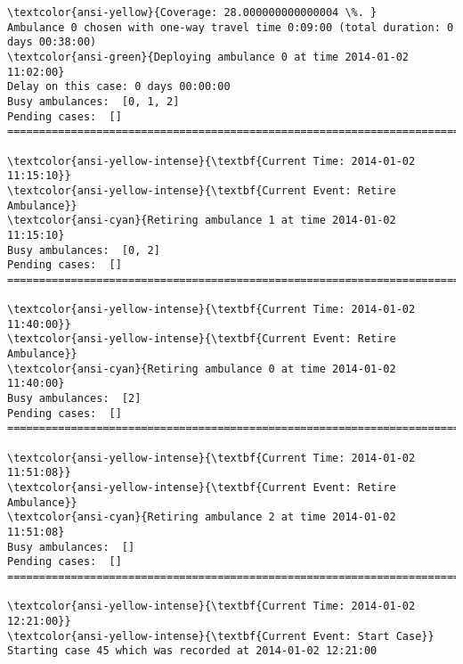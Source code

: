 \documentclass[11pt]{article}
\begin{document}
    \begin{Verbatim}[commandchars=\\\{\}]
\textcolor{ansi-yellow}{Coverage: 28.000000000000004 \%. }
Ambulance 0 chosen with one-way travel time 0:09:00 (total duration: 0 days 00:38:00)
\textcolor{ansi-green}{Deploying ambulance 0 at time 2014-01-02 11:02:00}
Delay on this case: 0 days 00:00:00
Busy ambulances:  [0, 1, 2]
Pending cases:  []
========================================================================

\textcolor{ansi-yellow-intense}{\textbf{Current Time: 2014-01-02 11:15:10}}
\textcolor{ansi-yellow-intense}{\textbf{Current Event: Retire Ambulance}}
\textcolor{ansi-cyan}{Retiring ambulance 1 at time 2014-01-02 11:15:10}
Busy ambulances:  [0, 2]
Pending cases:  []
========================================================================

\textcolor{ansi-yellow-intense}{\textbf{Current Time: 2014-01-02 11:40:00}}
\textcolor{ansi-yellow-intense}{\textbf{Current Event: Retire Ambulance}}
\textcolor{ansi-cyan}{Retiring ambulance 0 at time 2014-01-02 11:40:00}
Busy ambulances:  [2]
Pending cases:  []
========================================================================

\textcolor{ansi-yellow-intense}{\textbf{Current Time: 2014-01-02 11:51:08}}
\textcolor{ansi-yellow-intense}{\textbf{Current Event: Retire Ambulance}}
\textcolor{ansi-cyan}{Retiring ambulance 2 at time 2014-01-02 11:51:08}
Busy ambulances:  []
Pending cases:  []
========================================================================

\textcolor{ansi-yellow-intense}{\textbf{Current Time: 2014-01-02 12:21:00}}
\textcolor{ansi-yellow-intense}{\textbf{Current Event: Start Case}}
Starting case 45 which was recorded at 2014-01-02 12:21:00

    \end{Verbatim}

    \begin{center}
    \end{center}
    { \hspace*{\fill} \\}
    
\end{document}
